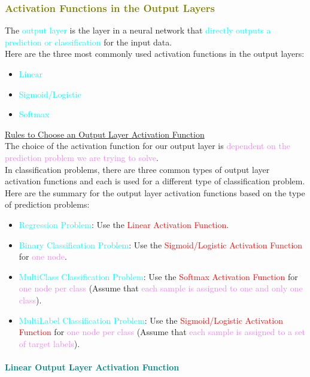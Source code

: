 \documentclass{book}
\begin{document}
\textcolor{olive}{\subsubsection{Activation Functions in the Output Layers}}
The \textcolor{cyan}{output layer} is the layer in a neural network that \textcolor{cyan}{directly outputs a prediction or classification} for the input data.\\
Here are the three most commonly used activation functions in the output layers:
\begin{itemize}
    \item \textcolor{cyan}{Linear}
    \item \textcolor{cyan}{Sigmoid/Logistic}
    \item \textcolor{cyan}{Softmax}
\end{itemize}
\vspace{2mm}
\uline{Rules to Choose an Output Layer Activation Function}\\
\vspace{1mm}
The choice of the activation function for our output layer is \textcolor{violet}{dependent on the prediction problem we are trying to solve}.\\
In classification problems, there are three common types of output layer activation functions and each is used for a different type of classification problem.\\
Here are the summary for the output layer activation functions based on the type of prediction problems:
\begin{itemize}
    \item \textcolor{cyan}{Regression Problem}: Use the \textcolor{red}{Linear Activation Function}.
    \item \textcolor{cyan}{Binary Classification Problem}: Use the \textcolor{red}{Sigmoid/Logistic Activation Function} for \textcolor{violet}{one node}.
    \item \textcolor{cyan}{MultiClass Classification Problem}: Use the \textcolor{red}{Softmax Activation Function} for \textcolor{violet}{one node per class} (Assume that \textcolor{violet}{each sample is assigned to one and only one class}).
    \item \textcolor{cyan}{MultiLabel Classification Problem}: Use the \textcolor{red}{Sigmoid/Logistic Activation Function} for \textcolor{violet}{one node per class} (Assume that \textcolor{violet}{each sample is assigned to a set of target labels}).
\end{itemize}
\newpage
\textcolor{teal}{\paragraph{Linear Output Layer Activation Function}}
\end{document}
